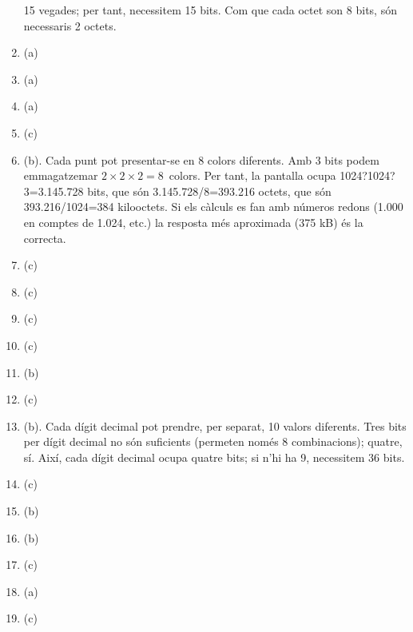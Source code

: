 \begin{enumerate}
  15 vegades; per tant, necessitem 15 bits. Com que cada octet son 8
  bits, són necessaris 2 octets.
\item (a)
\item (a)
\item (a)
\item (c)
\item (b). Cada punt pot presentar-se en 8 colors diferents. Amb 3
  bits podem emmagatzemar \(2\times2\times2=8\)~colors. Per tant, la
  pantalla ocupa 1024?1024?3=3.145.728 bits, que són
  3.145.728/8=393.216 octets, que són 393.216/1024=384 kilooctets. Si
  els càlculs es fan amb números redons (1.000 en comptes de 1.024,
  etc.) la resposta més aproximada (375 kB) és la correcta.
\item (c)
\item (c)
\item (c)
\item (c)
\item (b)
\item (c)
\item (b). Cada dígit decimal pot prendre, per separat, 10 valors
  diferents. Tres bits per dígit decimal no són suficients (permeten només 8
  combinacions); quatre, sí. Així, cada dígit decimal ocupa quatre
  bits; si n'hi ha 9, necessitem 36 bits.
\item (c)
\item (b)
\item (b)
\item (c)
\item (a)
\item (c)

\end{enumerate}
